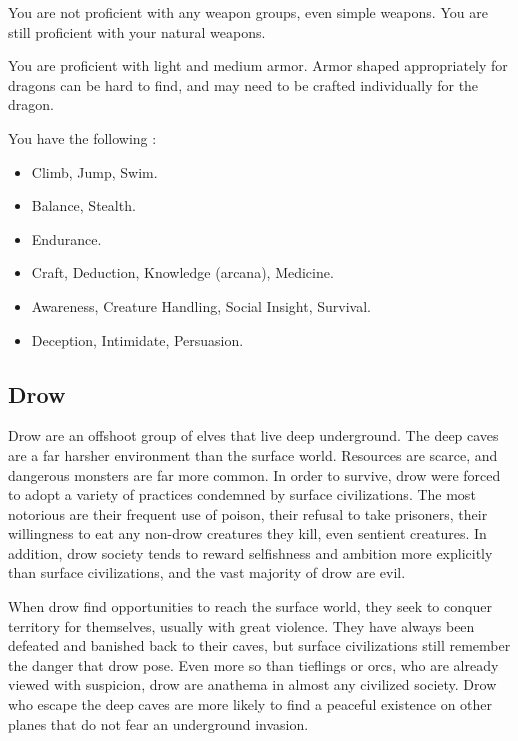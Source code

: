             You are not proficient with any weapon groups, even simple weapons.
            You are still proficient with your natural weapons.

            You are proficient with light and medium armor.
            Armor shaped appropriately for dragons can be hard to find, and may need to be crafted individually for the dragon.

            You have the following :
            \begin{itemize}
                \item {} Climb, Jump, Swim.
                \item {} Balance, Stealth.
                \item {} Endurance.
                \item {} Craft, Deduction, Knowledge (arcana), Medicine.
                \item {} Awareness, Creature Handling, Social Insight, Survival.
                \item {} Deception, Intimidate, Persuasion.
            \end{itemize}

    \subsection{Drow}

        Drow are an offshoot group of elves that live deep underground.
        The deep caves are a far harsher environment than the surface world.
        Resources are scarce, and dangerous monsters are far more common.
        In order to survive, drow were forced to adopt a variety of practices condemned by surface civilizations.
        The most notorious are their frequent use of poison, their refusal to take prisoners, their willingness to eat any non-drow creatures they kill, even sentient creatures.
        In addition, drow society tends to reward selfishness and ambition more explicitly than surface civilizations, and the vast majority of drow are evil.

        When drow find opportunities to reach the surface world, they seek to conquer territory for themselves, usually with great violence.
        They have always been defeated and banished back to their caves, but surface civilizations still remember the danger that drow pose.
        Even more so than tieflings or orcs, who are already viewed with suspicion, drow are anathema in almost any civilized society.
        Drow who escape the deep caves are more likely to find a peaceful existence on other planes that do not fear an underground invasion.


